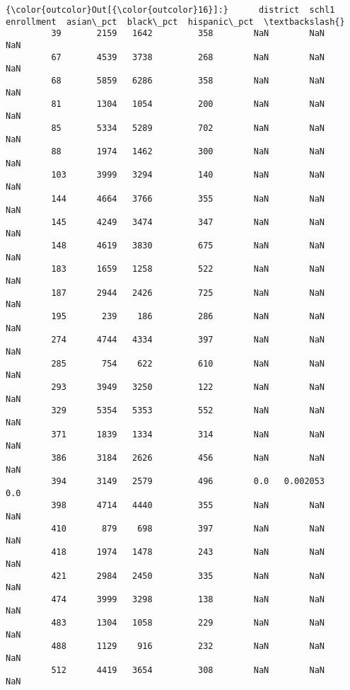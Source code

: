 \documentclass[11pt]{article}
\begin{document}
\begin{Verbatim}[commandchars=\\\{\}]
{\color{outcolor}Out[{\color{outcolor}16}]:}      district  schl1  enrollment  asian\_pct  black\_pct  hispanic\_pct  \textbackslash{}
         39       2159   1642         358        NaN        NaN           NaN   
         67       4539   3738         268        NaN        NaN           NaN   
         68       5859   6286         358        NaN        NaN           NaN   
         81       1304   1054         200        NaN        NaN           NaN   
         85       5334   5289         702        NaN        NaN           NaN   
         88       1974   1462         300        NaN        NaN           NaN   
         103      3999   3294         140        NaN        NaN           NaN   
         144      4664   3766         355        NaN        NaN           NaN   
         145      4249   3474         347        NaN        NaN           NaN   
         148      4619   3830         675        NaN        NaN           NaN   
         183      1659   1258         522        NaN        NaN           NaN   
         187      2944   2426         725        NaN        NaN           NaN   
         195       239    186         286        NaN        NaN           NaN   
         274      4744   4334         397        NaN        NaN           NaN   
         285       754    622         610        NaN        NaN           NaN   
         293      3949   3250         122        NaN        NaN           NaN   
         329      5354   5353         552        NaN        NaN           NaN   
         371      1839   1334         314        NaN        NaN           NaN   
         386      3184   2626         456        NaN        NaN           NaN   
         394      3149   2579         496        0.0   0.002053           0.0   
         398      4714   4440         355        NaN        NaN           NaN   
         410       879    698         397        NaN        NaN           NaN   
         418      1974   1478         243        NaN        NaN           NaN   
         421      2984   2450         335        NaN        NaN           NaN   
         474      3999   3298         138        NaN        NaN           NaN   
         483      1304   1058         229        NaN        NaN           NaN   
         488      1129    916         232        NaN        NaN           NaN   
         512      4419   3654         308        NaN        NaN           NaN   
         

\end{Verbatim}
\end{document}
